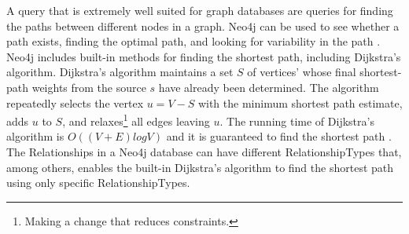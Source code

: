 A query that is extremely well suited for graph databases are queries for finding the paths between different nodes in a graph. Neo4j can be used to see whether a path exists, finding the optimal path, and looking for variability in the path \citep[p. 51]{bruggen14}. Neo4j includes built-in methods for finding the shortest path, including Dijkstra's algorithm. Dijkstra's algorithm \citep[p.658-662]{cormen09} maintains a set $S$ of vertices' whose final shortest-path weights from the source $s$ have already been determined. The algorithm repeatedly selects the vertex $u = V - S$ with the minimum shortest path estimate, adds $u$ to $S$, and relaxes\footnote{Making a change that reduces constraints.} all edges leaving $u$. The running time of Dijkstra's algorithm is $O((V + E)log V)$ and it is guaranteed to find the shortest path \citep[p.~661]{cormen09}. %
The Relationships in a Neo4j database can have different RelationshipTypes that, among others, enables the built-in Dijkstra's algorithm to find the shortest path using only specific RelationshipTypes.





